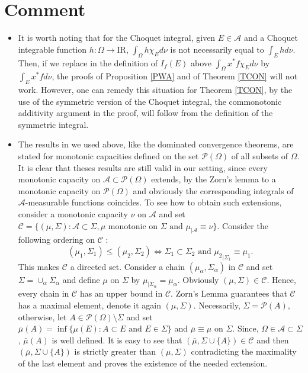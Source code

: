 \documentclass[preprint,authoryear,12pt]{article}%
\theoremstyle{definition}
\newcommand{\PP}{{\mathcal P}}
\renewcommand{\AA}{{\mathcal A}}
\newcommand{\IR}{{\mathrm{I\!R}}}
\newcommand{\CC}{{\mathscr C}}
\begin{document}

\section*{Comment}  
\begin{itemize}

\item[1)] It is worth noting that for the Choquet integral, given $E\in \AA$ and a Choquet integrable function $h:\Omega\rightarrow \IR$, $\int_\Omega h \chi_E d\nu$ is not necessarily equal to $\int_E h d\nu$. Then, if we replace in the definition of $I_f(E)$ above $\int_\Omega x^* f \chi_Ed\nu $ by $\int_E x^* fd\nu$, the proofs of Proposition \ref{PWA} and of Theorem \ref{TCON} will not work. However, one can remedy this situation for Theorem \ref{TCON}, by the use of the symmetric version of the Choquet integral,  the commonotonic additivity argument in the proof, will follow from the definition of the symmetric integral. 
\item[2)]  The results in \citep{DEN94} we used above, like the dominated convergence theorems, are stated for monotonic capacities defined on the set $\PP(\Omega)$ of all subsets of $\Omega$. It is clear that theses results are still valid in our setting, since every monotonic capacity on $\AA\subset \PP(\Omega)$ extends, by the Zorn's lemma to a monotonic capacity on $\PP(\Omega)$ and obviously the corresponding integrals of $\AA$-measurable functions coincides. To see how to obtain such extensions, consider a monotonic capacity $\nu$ on $\AA$ and set $\CC=\{(\mu,\Sigma) : \AA\subset \Sigma, \mu\text{ monotonic on }\Sigma\text{ and } \mu_{|\AA}\equiv \nu\}$.  Consider the following ordering on $\CC$ : $$(\mu_1,\Sigma_1)\leq (\mu_2,\Sigma_2) \Leftrightarrow  \Sigma_1\subset \Sigma_2 \text{ and } {\mu_2}_{|\Sigma_1}\equiv \mu_1.$$
This makes $\CC$ a directed set. Consider a chain $(\mu_\alpha,\Sigma_\alpha)$ in $\CC$ and set $\Sigma=\cup_\alpha \Sigma_\alpha$ and define $\mu$ on $\Sigma$ by $\mu_{|\Sigma_\alpha}=\mu_\alpha$. Obviously $(\mu,\Sigma)\in \CC$. Hence, every chain in $\CC$ has an upper bound in $\CC$. Zorn's Lemma guarantees that $\CC$ has a maximal element, denote it again $(\mu,\Sigma)$. Necessarily, $\Sigma=\PP(A)$, otherwise, let $A\in \PP(\Omega)\setminus \Sigma$ and set $\bar \mu(A)=\inf\{\mu (E) : A\subset E\text{ and }E\in \Sigma\}$ and $\bar \mu\equiv \mu$ on $\Sigma$. Since, $\Omega\in \AA\subset \Sigma$, $\bar \mu(A)$ is well defined. It is easy to see that $(\bar \mu,\Sigma\cup\{A\})\in \CC$ and then $(\bar \mu,\Sigma\cup\{A\})$ is strictly greater than $(\mu,\Sigma)$ contradicting the maximality of the last element and proves the existence of the needed extension.

\end{itemize}
\end{document}
